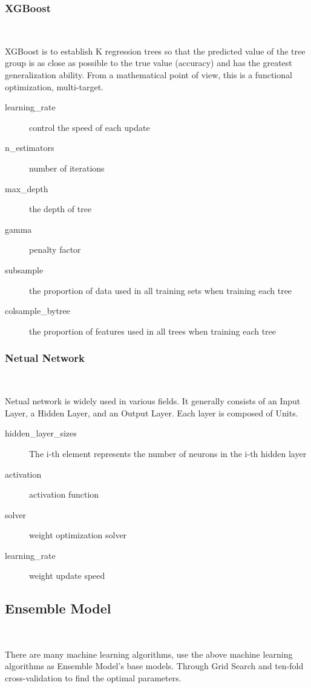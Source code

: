 \subsubsection{XGBoost}
\
 
XGBoost is to establish K regression trees 
so that the predicted value of 
the tree group is as close as possible to 
the true value (accuracy) and 
has the greatest generalization ability. 
From a mathematical point of view, 
this is a functional optimization, multi-target.

\begin{description}
	\item[learning_rate]  control the speed of each update
	\item[n_estimators] number of iterations
	\item[max_depth] the depth of tree
	\item[gamma] penalty factor%
	\item[subsample] the proportion of data used in 
		all training sets when training each tree
	\item[colsample_bytree] the proportion of features used 
		in all trees when training each tree
	\end{description}

\subsubsection{Netual Network}
\

Netual network is widely used in various fields.
It generally consists of 
an Input Layer, a Hidden Layer, and an Output Layer. 
Each layer is composed of Units. 
	
	
\begin{description}
	\item[hidden_layer_sizes] The i-th element represents 
		the number of neurons in the i-th hidden layer
	\item[activation] activation function
	\item[solver] weight optimization solver
	\item[learning_rate] weight update speed
\end{description}


\subsection{Ensemble Model}
\

There are many machine learning algorithms, 
use the above machine learning algorithms 
as Ensemble Model’s base models. 
Through Grid Search and
ten-fold cross-validation
to find the optimal parameters.


